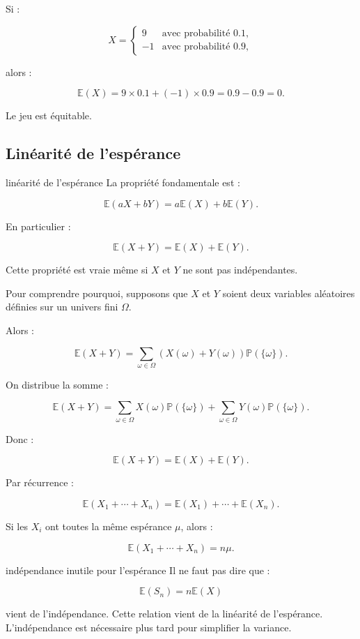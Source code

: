 \documentclass[11pt,a4paper]{article}
\newcommand{\E}{\mathbb{E}}
\newcommand{\Prob}{\mathbb{P}}
\begin{document}
\begin{exemple}
Si :

\[
X=
\begin{cases}
9 & \text{avec probabilité } 0.1,\\
-1 & \text{avec probabilité }0.9,
\end{cases}
\]

alors :

\[
\E(X)=9\times 0.1+(-1)\times 0.9=0.9-0.9=0.
\]

Le jeu est équitable.
\end{exemple}

\subsection{Linéarité de l'espérance}

\begin{preuve}{linéarité de l'espérance}
La propriété fondamentale est :

\[
\E(aX+bY)=a\E(X)+b\E(Y).
\]

En particulier :

\[
\E(X+Y)=\E(X)+\E(Y).
\]

Cette propriété est vraie même si $X$ et $Y$ ne sont pas indépendantes.

Pour comprendre pourquoi, supposons que $X$ et $Y$ soient deux variables aléatoires définies sur un univers fini $\Omega$.

Alors :

\[
\E(X+Y)=\sum_{\omega\in\Omega}(X(\omega)+Y(\omega))\Prob(\{\omega\}).
\]

On distribue la somme :

\[
\E(X+Y)=\sum_{\omega\in\Omega}X(\omega)\Prob(\{\omega\})
+
\sum_{\omega\in\Omega}Y(\omega)\Prob(\{\omega\}).
\]

Donc :

\[
\E(X+Y)=\E(X)+\E(Y).
\]

Par récurrence :

\[
\E(X_1+\cdots+X_n)=\E(X_1)+\cdots+\E(X_n).
\]

Si les $X_i$ ont toutes la même espérance $\mu$, alors :

\[
\E(X_1+\cdots+X_n)=n\mu.
\]
\end{preuve}

\begin{attention}{indépendance inutile pour l'espérance}
Il ne faut pas dire que :

\[
\E(S_n)=n\E(X)
\]

vient de l'indépendance. Cette relation vient de la linéarité de l'espérance. L'indépendance est nécessaire plus tard pour simplifier la variance.
\end{attention}
\end{document}
